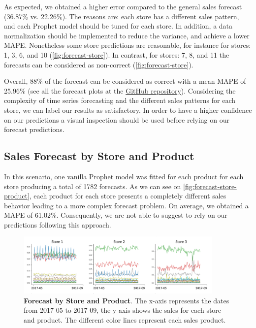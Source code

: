 As expected, we obtained a higher error compared to the general sales forecast (36.87\% vs. 22.26\%). The reasons are: each store has a different sales pattern, and each Prophet model should be tuned for each store. In addition, a data normalization should be implemented to reduce the variance, and achieve a lower MAPE. Nonetheless some store predictions are reasonable, for instance for stores: 1, 3, 6, and 10 (\autoref{fig:forecast-store}). In contrast, for stores: 7, 8, and 11 the forecasts can be considered as non-correct (\autoref{fig:forecast-store}).

Overall, 88\% of the forecast can be considered as correct with a mean MAPE of 25.96\% (see all the forecast plots at the \href{https://github.com/razielar/forecasting_retail-store}{GitHub repository}). Considering the complexity of time series forecasting and the different sales patterns for each store, we can label our results as satisfactory. In order to have a higher confidence on our predictions a visual inspection should be used before relying on our forecast predictions.

\subsection[Sales Forecast by Store and Product]{Sales Forecast by Store and Product}
\label{sec:forecast-product}

In this scenario, one vanilla Prophet model was fitted for each product for each store producing a total of 1782 forecasts. As we can see on \autoref{fig:forecast-store-product}, each product for each store presents a completely different sales behavior leading to a more complex forecast problem. On average, we obtained a MAPE of 61.02\%. Consequently, we are not able to suggest to rely on our predictions following this approach. 

\begin{figure}[!htb]
  \centering
  \includegraphics[width=0.9\textwidth]{plots/forecast/forecast_bystore_product.png}
  \caption[Forecast by Store and Product]{\textbf{Forecast by Store and Product}. The x-axis represents the dates from 2017-05 to 2017-09, the y-axis shows the sales for each store and product. The different color lines represent each sales product.}
  \label{fig:forecast-store-product}
\end{figure}

